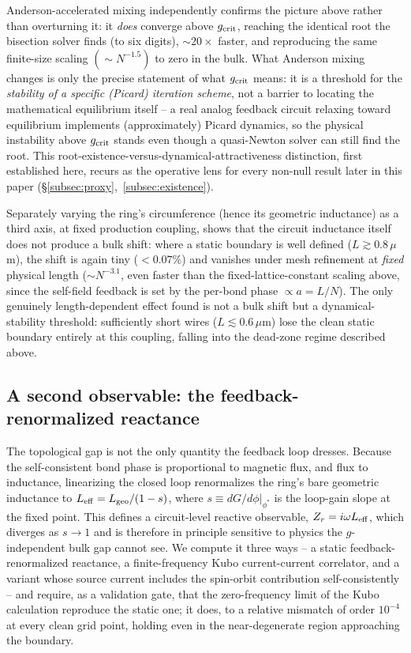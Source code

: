 \documentclass[aps,physrev,reprint,superscriptaddress,amsmath,amssymb,floatfix]{revtex4-2}
\begin{document}
Anderson-accelerated mixing independently confirms the picture above
rather than overturning it: it \emph{does} converge above $g_{\rm crit}$,
reaching the identical root the bisection solver finds (to six digits),
$\sim20\times$ faster, and reproducing the same finite-size scaling
$(\sim N^{-1.5})$ to zero in the bulk. What Anderson mixing changes is
only the precise statement of what $g_{\rm crit}$ means: it is a
threshold for the \emph{stability of a specific (Picard) iteration
scheme}, not a barrier to locating the mathematical equilibrium itself --
a real analog feedback circuit relaxing toward equilibrium implements
(approximately) Picard dynamics, so the physical instability above
$g_{\rm crit}$ stands even though a quasi-Newton solver can still find the
root. This root-existence-versus-dynamical-attractiveness distinction,
first established here, recurs as the operative lens for every non-null
result later in this paper (\S\ref{subsec:proxy},~\ref{subsec:existence}).

Separately varying the ring's circumference (hence its geometric
inductance) as a third axis, at fixed production coupling, shows that the
circuit inductance itself does not produce a bulk shift: where a static
boundary is well defined ($L\gtrsim0.8\,\mu$m), the shift is again tiny
($<0.07\%$) and vanishes under mesh refinement at \emph{fixed} physical
length ($\sim N^{-3.1}$, even faster than the fixed-lattice-constant
scaling above, since the self-field feedback is set by the per-bond
phase $\propto a=L/N$). The only genuinely length-dependent effect found
is not a bulk shift but a dynamical-stability threshold: sufficiently
short wires ($L\lesssim0.6\,\mu$m) lose the clean static boundary
entirely at this coupling, falling into the dead-zone regime described
above.

\FloatBarrier
\subsection{A second observable: the feedback-renormalized reactance}
\label{subsec:impedance}

The topological gap is not the only quantity the feedback loop dresses.
Because the self-consistent bond phase is proportional to magnetic flux,
and flux to inductance, linearizing the closed loop renormalizes the
ring's bare geometric inductance to $L_{\rm eff}=L_{\rm geo}/(1-s)$, where
$s\equiv dG/d\phi|_{\phi^*}$ is the loop-gain slope at the fixed point.
This defines a circuit-level reactive observable, $Z_r=i\omega L_{\rm
eff}$, which diverges as $s\to1$ and is therefore in principle sensitive to
physics the $g$-independent bulk gap cannot see. We compute it three ways
-- a static feedback-renormalized reactance, a finite-frequency Kubo
current-current correlator, and a variant whose source current includes
the spin-orbit contribution self-consistently -- and require, as a
validation gate, that the zero-frequency limit of the Kubo calculation
reproduce the static one; it does, to a relative mismatch of order
$10^{-4}$ at every clean grid point, holding even in the near-degenerate
region approaching the boundary.
\end{document}

